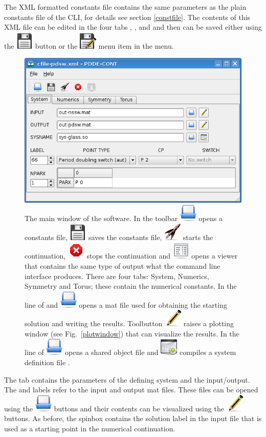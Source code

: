 \documentclass[10pt,a4paper]{ddedoc}
\newcommand{\iconRun}{\protect\includegraphics[height=0.8\baselineskip]{fig/cr32-action-launch}}
\newcommand{\iconStop}{\protect\includegraphics[height=0.8\baselineskip]{fig/cr32-action-stop}}
\newcommand{\iconBuild}{\protect\includegraphics[height=0.8\baselineskip]{fig/cr32-action-build}}
\newcommand{\iconSaveAs}{\protect\includegraphics[height=0.8\baselineskip]{fig/cr32-action-filesaveas}}
\newcommand{\iconPencil}{\protect\includegraphics[height=0.8\baselineskip]{fig/cr32-action-pencil}}
\newcommand{\iconText}{\protect\includegraphics[height=0.8\baselineskip]{fig/cr32-action-view_text}}
\newcommand{\iconOpen}{\protect\includegraphics[height=0.8\baselineskip]{fig/cr32-action-fileopen}}
\newcommand{\iconSave}{\protect\includegraphics[height=0.8\baselineskip]{fig/cr32-action-filesave}}
\begin{document}
The XML formatted constants file contains the same parameters as the
plain constants file of the CLI, for details see section \ref{constfile}. 
The contents of this XML file can be edited in the four tabs ,
,  and  and then can be saved
either using the  \iconSave{} button or the 
\iconSaveAs{} menu item in the  menu.
\begin{figure}
\begin{center}
\includegraphics[scale=0.5]{fig/mainwindow}
\caption{The main window of the software. In the toolbar \iconOpen{} opens a constants file, 
\iconSave{} saves the constants file, \iconRun{} starts the continuation, \iconStop{} stops the continuation 
and \iconText{} opens a viewer that contains the same type of output what the command line interface produces. 
There are four tabs: System, Numerics, Symmetry and Torus; these contain the numerical constants. In the line of  
and  \iconOpen{} opens a {\sc{}mat} file used for obtaining the starting solution and writing 
the results. Toolbutton \iconPencil{} raises a plotting window (see Fig.\ \ref{plotwindow}) that can visualize the results.
In the line of  \iconOpen{} opens a  shared object file and \iconBuild{} compiles 
a system definition file  . }
\label{mainwindow}
\end{center}
\end{figure}

The  tab contains the parameters of the defining system and the
input/output. The  and  labels refer to the input and
output {\sc{}mat} files. These files can be opened using the  \iconOpen{}
buttons and their contents can be visualized using the 
\iconPencil{}
buttons. As before, the  spinbox contains the solution label in
the input file that is used as a starting point in the numerical continuation.
\end{document}
